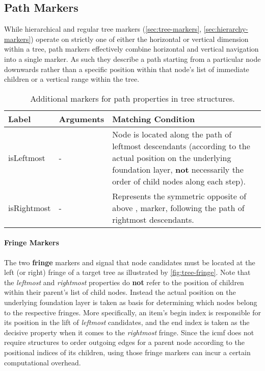 \documentclass[11pt,a4paper]{report}
\begin{document}
\subsection{Path Markers}
\label{sec:path-markers}

While hierarchical and regular tree markers (\ref{sec:tree-markers}, \ref{sec:hierarchy-markers}) operate on strictly one of either the horizontal or vertical dimension within a tree, path markers effectively combine horizontal and vertical navigation into a single marker.
As such they describe a path starting from a particular node downwards rather than a specific position within that node's list of immediate children or a vertical range within the tree.

\begin{table}[!htb]\centering
	\begin{tabular}{|p{}|p{}|p{}|}
		\hline 
		\textbf{Label} & \textbf{Arguments} & \textbf{Matching Condition} \\ 
		\hline 
		\hline 
		isLeftmost & - & Node is located along the path of leftmost descendants (according to the actual position on the underlying foundation layer, \textbf{not} necessarily the order of child nodes along each step). \\  
		\hline 
		isRightmost & - & Represents the symmetric opposite of above \query{isLeftmost}, marker, following the path of rightmost descendants. \\  
		\hline 
	\end{tabular}
	\caption[Path markers]{Additional markers for path properties in tree structures.}
	\label{tab:tree-path-markers}
\end{table}

\paragraph{Fringe Markers}
\noindent The two \textbf{fringe} markers  and  signal that node candidates must be located at the left (or right) fringe of a target tree as illustrated by \cref{fig:tree-fringe}.
Note that the \textit{leftmost} and \textit{rightmost} properties do \textbf{not} refer to the position of children within their parent's list of child nodes.
Instead the actual position on the underlying foundation layer is taken as basis for determining which nodes belong to the respective fringes.
More specifically, an item's begin index is responsible for its position in the lift of \textit{leftmost} candidates, and the end index is taken as the decisive property when it comes to the \textit{rightmost} fringe.
Since the \ac{icmf} does not require structures to order outgoing edges for a parent node according to the positional indices of its children, using those fringe markers can incur a certain computational overhead.
\end{document}
